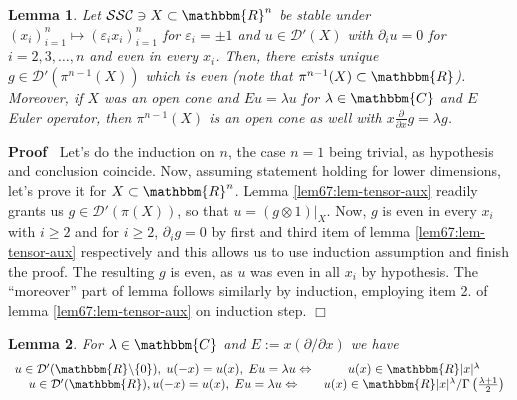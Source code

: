 \documentclass{article}
\newcommand{\assign}{:=}
\newenvironment{proof}{\noindent\textbf{Proof\ }}{\hspace*{\fill}$\Box$\medskip}
\numberwithin{definition}{section}
\newtheorem{lemma}{Lemma}
\numberwithin{lemma}{section}
\numberwithin{proposition}{section}
{\theorembodyfont{\rmfamily}\newtheorem{remark}{Remark}
\numberwithin{remark}{section}
}
\begin{document}
\begin{lemma}
  \label{lem67:lem-tensor}Let $\mathcal{S}\mathcal{S}\mathcal{C} \ni X \subset
  \mathbbm{R}^n$ be stable under $( x_i)_{i = 1}^n \mapsto ( \varepsilon_i
  x_i)_{i = 1}^n$ for $\varepsilon_i = \pm 1$ and $u \in \mathcal{D}' ( X)$
  with $\partial_i u = 0$ for $i = 2, 3, \ldots, n$ and even in every $x_i$.
  Then, there exists unique $g \in \mathcal{D}' ( \pi^{n - 1} ( X))$ which is
  even (note that $\pi^{n - 1} ( X) \subset \mathbbm{R}$). Moreover, if $X$
  was an open cone and $E u = \lambda u$ for $\lambda \in \mathbbm{C}$ and $E$
  Euler operator, then $\pi^{n - 1} ( X)$ is an open cone as well with $x
  \frac{\partial}{\partial x} g = \lambda g$.
\end{lemma}

\begin{proof}
  Let's do the induction on $n$, the case $n = 1$ being trivial, as hypothesis
  and conclusion coincide. Now, assuming statement holding for lower
  dimensions, let's prove it for $X \subset \mathbbm{R}^n$. Lemma
  \ref{lem67:lem-tensor-aux} readily grants us $g \in \mathcal{D}' ( \pi (
  X))$, so that $u = ( g \otimes 1) |_X$. Now, $g$ is even in every $x_i$ with
  $i \geqslant 2$ and for $i \geqslant 2$, $\partial_i g = 0$ by first and
  third item of lemma \ref{lem67:lem-tensor-aux} respectively and this allows
  us to use induction assumption and finish the proof. The resulting $g$ is
  even, as $u$ was even in all $x_i$ by hypothesis. The ``moreover'' part of
  lemma follows similarly by induction, employing item 2. of lemma
  \ref{lem67:lem-tensor-aux} on induction step.
\end{proof}

\begin{lemma}
  \label{lem67:lem-homogR}For $\lambda \in \mathbbm{C}$ and $E \assign x (
  \partial / \partial x)$ we have
  \[ \begin{array}{cc}
       \begin{array}{c}
         
       \end{array} u \in \mathcal{D}' ( \mathbbm{R}\backslash \{ 0 \}), \; u (
       - x) = u ( x), \; E u = \lambda u \Leftrightarrow & u ( x) \in
       \mathbbm{R} | x |^{\lambda}\\
       u \in \mathcal{D}' ( \mathbbm{R}), u ( - x) = u ( x), \; E u = \lambda
       u \Leftrightarrow & u ( x) \in \mathbbm{R} | x |^{\lambda} / \Gamma
       \left( \frac{\lambda + 1}{2} \right)
     \end{array} \]
\end{lemma}
\end{document}
